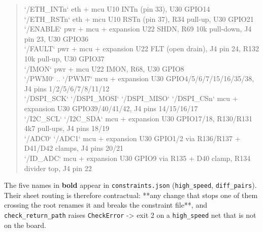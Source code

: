 \documentclass[11pt,a4paper]{article}
\begin{document}
\begin{quote}
\textbar{} `/ETH\_INTn` \textbar{} eth + mcu \textbar{} U10 INTn (pin 33), U30 GPIO14 \textbar{}\\
\textbar{} `/ETH\_RSTn` \textbar{} eth + mcu \textbar{} U10 RSTn (pin 37), R34 pull-up, U30 GPIO21 \textbar{}\\
\textbar{} `/ENABLE` \textbar{} pwr + mcu + expansion \textbar{} U22 SHDN, R69 10k pull-down, J4 pin 23, U30 GPIO36 \textbar{}\\
\textbar{} `/FAULT` \textbar{} pwr + mcu + expansion \textbar{} U22 FLT (open drain), J4 pin 24, R132 10k pull-up, U30 GPIO37 \textbar{}\\
\textbar{} `/IMON` \textbar{} pwr + mcu \textbar{} U22 IMON, R68, U30 GPIO8 \textbar{}\\
\textbar{} `/PWM0` .. `/PWM7` \textbar{} mcu + expansion \textbar{} U30 GPIO4/5/6/7/15/16/35/38, J4 pins 1/2/5/6/7/8/11/12 \textbar{}\\
\textbar{} `/DSPI\_SCK` `/DSPI\_MOSI` `/DSPI\_MISO` `/DSPI\_CSn` \textbar{} mcu + expansion \textbar{} U30 GPIO39/40/41/42, J4 pins 14/15/16/17 \textbar{}\\
\textbar{} `/I2C\_SCL` `/I2C\_SDA` \textbar{} mcu + expansion \textbar{} U30 GPIO17/18, R130/R131 4k7 pull-ups, J4 pins 18/19 \textbar{}\\
\textbar{} `/ADC0` `/ADC1` \textbar{} mcu + expansion \textbar{} U30 GPIO1/2 via R136/R137 + D41/D42 clamps, J4 pins 20/21 \textbar{}\\
\textbar{} `/ID\_ADC` \textbar{} mcu + expansion \textbar{} U30 GPIO9 via R135 + D40 clamp, R134 divider top, J4 pin 22 \textbar{}
\end{quote}
The five names in \textbf{bold} appear in \texttt{constraints.json} (\texttt{high\_speed}, \texttt{diff\_pairs}). Their sheet routing is therefore contractual: {*}{*}any change that stops one of them crossing the root renames it and breaks the constraint file{*}{*}, and \texttt{check\_return\_path} raises \texttt{CheckError} -\textgreater{} exit 2 on a \texttt{high\_speed} net that is not on the board.
\end{document}
